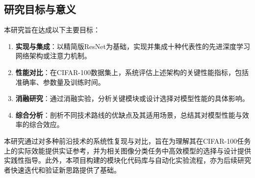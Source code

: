 \documentclass[a4paper]{article}
\begin{document}
\subsection{研究目标与意义}
本研究旨在达成以下主要目标：
\begin{enumerate}
    \item \textbf{实现与集成}：以精简版ResNet为基础，实现并集成十种代表性的先进深度学习网络架构或注意力机制。
    \item \textbf{性能对比}：在CIFAR-100数据集上，系统评估上述架构的关键性能指标，包括准确率、参数量及训练时间。
    \item \textbf{消融研究}：通过消融实验，分析关键模块或设计选择对模型性能的具体影响。
    \item \textbf{综合分析}：剖析不同技术路线的优缺点及其适用场景，总结其对模型性能与效率的综合效应。
\end{enumerate}
本研究通过对多种前沿技术的系统性复现与对比，旨在为理解其在CIFAR-100任务上的实际效能提供实证参考，并为相关图像分类任务中高效模型的选择与设计提供实践性指导。此外，本项目构建的模块化代码库与自动化实验流程，亦为后续研究者快速迭代和验证新思路提供了基础。
\end{document}
